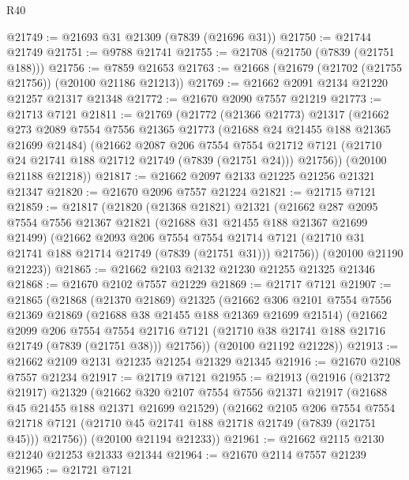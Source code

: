 \begin{lexlean}{R40}
\begin{coremodule}
@21749 := @21693 @31 @21309 (@7839 (@21696 @31))
@21750 := @21744 @21749
@21751 := @9788 @21741
@21755 := @21708 (@21750 (@7839 (@21751 @188)))
@21756 := @7859 @21653
@21763 := @21668 (@21679 (@21702 (@21755 @21756)) (@20100 @21186 @21213))
@21769 := @21662 @2091 @2134 @21220 @21257 @21317 @21348
@21772 := @21670 @2090 @7557 @21219
@21773 := @21713 @7121
@21811 := @21769
    (@21772
      (@21366 @21773)
      @21317
      (@21662
        @273
        @2089
        @7554
        @7556
        @21365
        @21773
        (@21688 @24 @21455 @188 @21365 @21699 @21484)
        (@21662
          @2087
          @206
          @7554
          @7554
          @21712
          @7121
          (@21710 @24 @21741 @188 @21712 @21749 (@7839 (@21751 @24)))
          @21756))
      (@20100 @21188 @21218))
@21817 := @21662 @2097 @2133 @21225 @21256 @21321 @21347
@21820 := @21670 @2096 @7557 @21224
@21821 := @21715 @7121
@21859 := @21817
    (@21820
      (@21368 @21821)
      @21321
      (@21662
        @287
        @2095
        @7554
        @7556
        @21367
        @21821
        (@21688 @31 @21455 @188 @21367 @21699 @21499)
        (@21662
          @2093
          @206
          @7554
          @7554
          @21714
          @7121
          (@21710 @31 @21741 @188 @21714 @21749 (@7839 (@21751 @31)))
          @21756))
      (@20100 @21190 @21223))
@21865 := @21662 @2103 @2132 @21230 @21255 @21325 @21346
@21868 := @21670 @2102 @7557 @21229
@21869 := @21717 @7121
@21907 := @21865
    (@21868
      (@21370 @21869)
      @21325
      (@21662
        @306
        @2101
        @7554
        @7556
        @21369
        @21869
        (@21688 @38 @21455 @188 @21369 @21699 @21514)
        (@21662
          @2099
          @206
          @7554
          @7554
          @21716
          @7121
          (@21710 @38 @21741 @188 @21716 @21749 (@7839 (@21751 @38)))
          @21756))
      (@20100 @21192 @21228))
@21913 := @21662 @2109 @2131 @21235 @21254 @21329 @21345
@21916 := @21670 @2108 @7557 @21234
@21917 := @21719 @7121
@21955 := @21913
    (@21916
      (@21372 @21917)
      @21329
      (@21662
        @320
        @2107
        @7554
        @7556
        @21371
        @21917
        (@21688 @45 @21455 @188 @21371 @21699 @21529)
        (@21662
          @2105
          @206
          @7554
          @7554
          @21718
          @7121
          (@21710 @45 @21741 @188 @21718 @21749 (@7839 (@21751 @45)))
          @21756))
      (@20100 @21194 @21233))
@21961 := @21662 @2115 @2130 @21240 @21253 @21333 @21344
@21964 := @21670 @2114 @7557 @21239
@21965 := @21721 @7121

\end{coremodule}
\end{lexlean}
